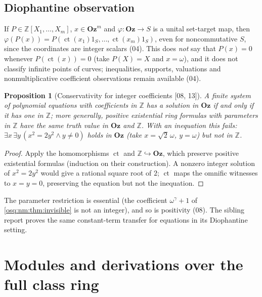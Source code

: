 \documentclass[11pt,letterpaper]{article}
\numberwithin{equation}{section}
\newtheorem{proposition}[proposition]{Proposition}
\theoremstyle{definition}
\theoremstyle{remark}
\theoremstyle{plain}
\newcommand{\Oz}{\mathbf{Oz}}
\newcommand{\Z}{\mathbb Z}
\newcommand{\ct}{\operatorname{ct}}
\newcommand{\src}[1]{\textup{\textsf{[#1]}}}
\begin{document}
\subsection{Diophantine observation}\label{osq:sub:dioph}
If $P\in\Z[X_1,\dots,X_m]$, $x\in\Oz^m$ and $\varphi:\Oz\to S$ is a unital set-target map,
then $\varphi(P(x))=P(\ct(x_1)1_S,\dots,\ct(x_m)1_S)$, even for noncommutative $S$, since
the coordinates are integer scalars (04). This does \emph{not} say that $P(x)=0$ whenever
$P(\ct(x))=0$ (take $P(X)=X$ and $x=\omega$), and it does not classify infinite points of
curves; inequalities, supports, valuations and nonmultiplicative coefficient observations
remain available (04).

\begin{proposition}[Conservativity for integer coefficients \src{08, 13}]\label{osq:prop:conservative}
A finite system of polynomial equations with coefficients in $\Z$ has a solution in $\Oz$
if and only if it has one in $\Z$; more generally, positive existential ring formulas with
parameters in $\Z$ have the same truth value in $\Oz$ and $\Z$. With an inequation this
fails: $\exists x\,\exists y\,(x^2=2y^2\wedge y\ne0)$ holds in $\Oz$ (take
$x=\sqrt2\,\omega$, $y=\omega$) but not in $\Z$.
\end{proposition}
\begin{proof}
Apply the homomorphisms $\ct$ and $\Z\hookrightarrow\Oz$, which preserve positive
existential formulas (induction on their construction). A nonzero integer solution of
$x^2=2y^2$ would give a rational square root of $2$; $\ct$ maps the omnific witnesses to
$x=y=0$, preserving the equation but not the inequation.
\end{proof}

The parameter restriction is essential (the coefficient $\omega^\gamma+1$ of
\cref{osq:nm:thm:invisible} is not an integer), and so is positivity (08). The sibling report
\cite{RepoOdg} proves the same constant-term transfer for equations in its Diophantine
setting.

\section{Modules and derivations over the full class ring}\label{osq:sec:modules}
\end{document}
